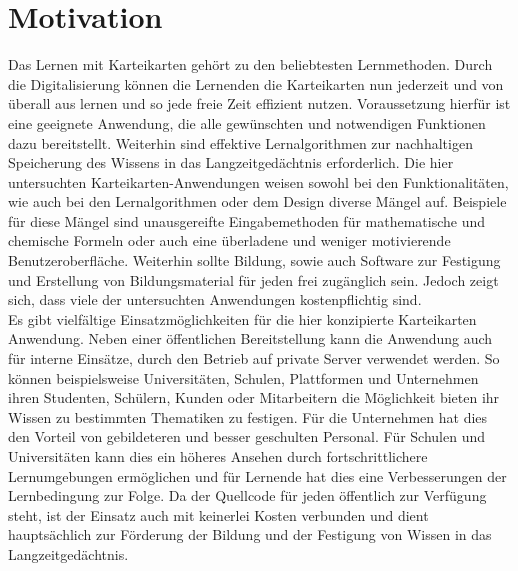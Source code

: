 %
%





\section{Motivation}
Das Lernen mit Karteikarten gehört zu den beliebtesten Lernmethoden. Durch die Digitalisierung können die Lernenden die Karteikarten nun jederzeit und von überall aus lernen und so jede freie Zeit effizient nutzen. Voraussetzung hierfür ist eine geeignete Anwendung, die alle gewünschten und notwendigen Funktionen dazu bereitstellt. Weiterhin sind effektive Lernalgorithmen zur nachhaltigen Speicherung des Wissens in das Langzeitgedächtnis erforderlich. Die hier untersuchten Karteikarten-Anwendungen weisen sowohl bei den Funktionalitäten, wie auch bei den Lernalgorithmen oder dem Design diverse Mängel auf. Beispiele für diese Mängel sind unausgereifte Eingabemethoden für mathematische und chemische Formeln oder auch eine überladene und weniger motivierende Benutzeroberfläche. Weiterhin sollte Bildung, sowie auch Software zur Festigung und Erstellung von Bildungsmaterial für jeden frei zugänglich sein. Jedoch zeigt sich, dass viele der untersuchten Anwendungen kostenpflichtig sind. \\

\noindent Es gibt vielfältige Einsatzmöglichkeiten für die hier konzipierte Karteikarten Anwendung. Neben einer öffentlichen Bereitstellung kann die Anwendung auch für interne Einsätze, durch den Betrieb auf private Server verwendet werden. So können beispielsweise Universitäten, Schulen, Plattformen und Unternehmen ihren Studenten, Schülern, Kunden oder Mitarbeitern die Möglichkeit bieten ihr Wissen zu bestimmten Thematiken zu festigen. Für die Unternehmen hat dies den Vorteil von gebildeteren und besser geschulten Personal. Für Schulen und Universitäten kann dies ein höheres Ansehen durch fortschrittlichere Lernumgebungen ermöglichen und für Lernende hat dies eine Verbesserungen der Lernbedingung zur Folge. Da der Quellcode für jeden öffentlich zur Verfügung steht, ist der Einsatz auch mit keinerlei Kosten verbunden und dient hauptsächlich zur Förderung der Bildung und der Festigung von Wissen in das Langzeitgedächtnis. \\


